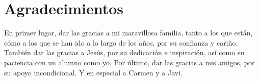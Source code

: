 \noindent \textbf{\myProf}

\chapter*{Agradecimientos}
\thispagestyle{empty}

       \vspace{1cm}

En primer lugar, dar las gracias a mi maravillosa familia, tanto a los que están, cómo a los que se han ido a lo largo de los años, por su confianza y cariño.
\intro También dar las gracias a Jesús, por su dedicación e inspiración, así como su paciencia con un alumno como yo.
\intro Por último, dar las gracias a mis amigos, por su apoyo incondicional. Y en especial a Carmen y a Javi.
